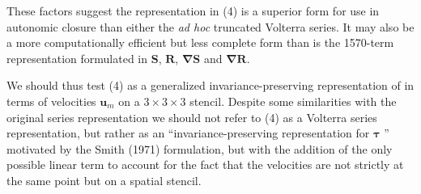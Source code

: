 These factors suggest the representation in (4) is a superior form for use in autonomic closure than either the \textit{ad hoc} truncated Volterra series.  It may also be a more computationally efficient but less complete form than is the 1570-term representation formulated in $\mathbf{S}$, $\mathbf{R}$, $\mathbf{\nabla S}$ and $\mathbf{\nabla R}$.

We should thus test (4) as a generalized invariance-preserving representation of   in terms of velocities $\mathbf{u}_{m}$ on a $3 \times 3 \times 3$  stencil. Despite some similarities with the original series representation we should not refer to (4) as a Volterra series representation, but rather as an ``invariance-preserving representation for  $\mathbf{\tau}$ '' motivated by the Smith (1971) formulation, but with the addition of the only possible linear term to account for the fact that the velocities are not strictly at the same point but on a spatial stencil.

